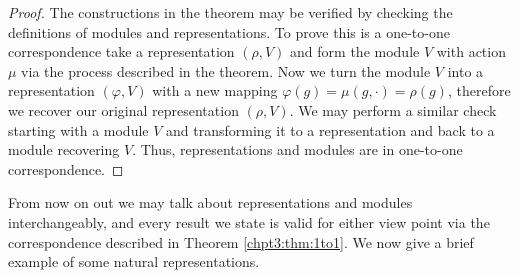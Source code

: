 \documentclass[11pt]{report}
\begin{document}
\begin{proof}
	The constructions in the theorem may be verified by checking the 
	definitions of modules and representations. To prove this is a one-to-one 
	correspondence take a representation $(\rho,V)$ and form the module $V$ 
	with action $\mu$ via 
	the process described in the theorem. Now we turn the module $V$
	into a representation $(\varphi,V)$ with a new mapping $\varphi(g) = 
	\mu(g,\cdot) = \rho(g)$, 
	therefore we recover our original representation $(\rho,V)$. We may perform 
	a similar check starting with a module $V$ and transforming it to a 
	representation and back to a module recovering $V$. Thus, 
	representations and modules are in one-to-one correspondence. 
\end{proof}

From now on out we may talk about representations and modules interchangeably, and every result we state is valid for either view point via the correspondence described in Theorem \ref{chpt3:thm:1to1}. We now give a brief example of some natural representations.
\end{document}

